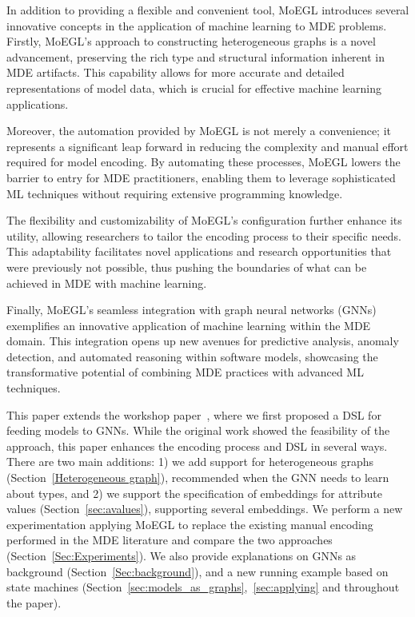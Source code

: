 \documentclass[journal,article,submit,moreauthors,technologies]{Definitions/mdpi}
\begin{document}
In addition to providing a flexible and convenient tool, MoEGL introduces several innovative concepts in the application of machine learning to MDE problems. Firstly, MoEGL's approach to constructing heterogeneous graphs is a novel advancement, preserving the rich type and structural information inherent in MDE artifacts. This capability allows for more accurate and detailed representations of model data, which is crucial for effective machine learning applications.

Moreover, the automation provided by MoEGL is not merely a convenience; it represents a significant leap forward in reducing the complexity and manual effort required for model encoding. By automating these processes, MoEGL lowers the barrier to entry for MDE practitioners, enabling them to leverage sophisticated ML techniques without requiring extensive programming knowledge.

The flexibility and customizability of MoEGL's configuration further enhance its utility, allowing researchers to tailor the encoding process to their specific needs. This adaptability facilitates novel applications and research opportunities that were previously not possible, thus pushing the boundaries of what can be achieved in MDE with machine learning.

Finally, MoEGL's seamless integration with graph neural networks (GNNs) exemplifies an innovative application of machine learning within the MDE domain. This integration opens up new avenues for predictive analysis, anomaly detection, and automated reasoning within software models, showcasing the transformative potential of combining MDE practices with advanced ML techniques.

This paper extends the workshop paper~\cite{rajaei2021dsl}, where we first proposed a DSL for feeding models to GNNs.
While the original work showed the feasibility of the approach, this paper enhances the encoding process and DSL in several ways. There are two main additions: 1) we add support for heterogeneous graphs (Section~\ref{Heterogeneous graph}), recommended when the GNN needs to learn about types, and 2) we support the specification of embeddings for attribute values (Section~\ref{sec:avalues}), supporting several embeddings.
We perform a new experimentation applying MoEGL to replace the existing manual encoding performed in the MDE literature and compare the two approaches (Section~\ref{Sec:Experiments}). We also provide explanations on GNNs as background (Section~\ref{Sec:background}), and a new running example based on state machines (Section~\ref{sec:models_as_graphs},~\ref{sec:applying} and throughout the paper).
\end{document}
